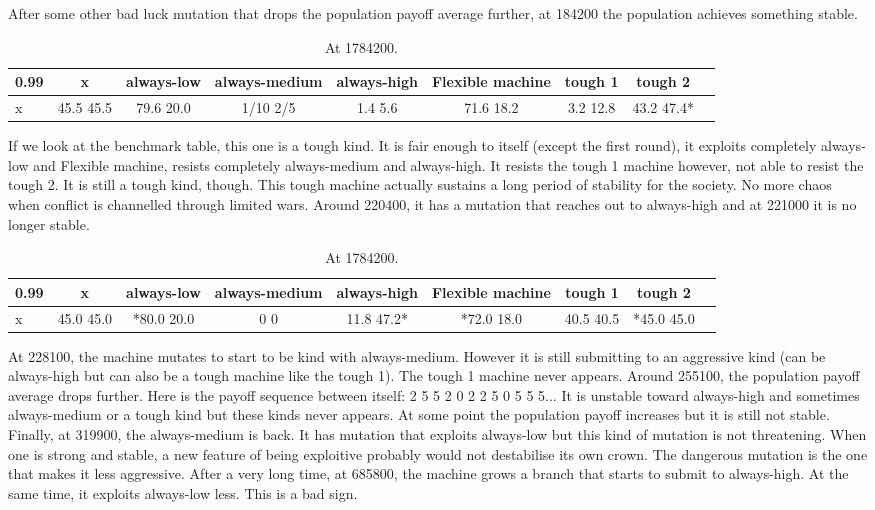 \documentclass[12.5pt]{report}
\begin{document}
After some other bad luck mutation that drops the population payoff average further, at 184200 the population achieves something stable.
\begin{table}[h!]
\center
\begin{tabular}{l|cccccccc}
\textbf{0.99}& x & always-low & always-medium & always-high & Flexible machine &tough 1 & tough 2\\
\hline
x&45.5 45.5  &    79.6 20.0   &   1/10 2/5   &     1.4 5.6   &    71.6 18.2  &    3.2 12.8   &   43.2 47.4*\\
\end{tabular}
\caption{At 1784200.}
\end{table}
If we look at the benchmark table, this one is a tough kind. It is fair enough to itself (except the first round), it exploits completely always-low and Flexible machine, resists completely always-medium and always-high. It resists the tough 1 machine however, not able to resist the tough 2. It is still a tough kind, though. This tough machine actually sustains a long period of stability for the society. No more chaos when conflict is channelled through limited wars. Around 220400, it has a mutation that reaches out to always-high and at 221000 it is no longer stable.\\

\begin{table}[h!]
\center
\begin{tabular}{l|cccccccc}
\textbf{0.99}& x & always-low & always-medium & always-high & Flexible machine &tough 1 & tough 2\\
\hline
x&45.0 45.0  &   *80.0 20.0 &        0 0    &     11.8 47.2*  &  *72.0 18.0    &  40.5 40.5  &   *45.0 45.0\\
\end{tabular}
\caption{At 1784200.}
\end{table}
At 228100, the machine mutates to start to be kind with always-medium. However it is still submitting to an aggressive kind (can be always-high but can also be a tough machine like the tough 1). The tough 1 machine never appears. Around 255100, the population payoff average drops further. Here is the payoff sequence between itself: 2 5 5 2 0 2 2 5 0 5 5 5... It is unstable toward always-high and sometimes always-medium or a tough kind but these kinds never appears. At some point the population payoff increases but it is still not stable.\\

Finally, at 319900, the always-medium is back. It has mutation that exploits always-low but this kind of mutation is not threatening. When one is strong and stable, a new feature of being exploitive probably would not destabilise its own crown. The dangerous mutation is the one that makes it less aggressive. After a very long time, at 685800, the machine grows a branch that starts to submit to always-high. At the same time, it exploits always-low less. This is a bad sign.\\
\end{document}
